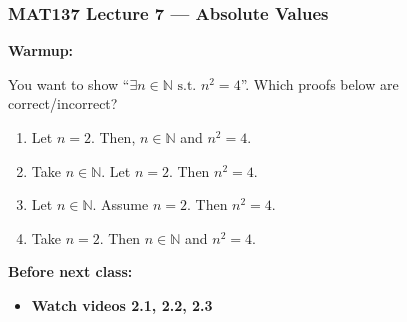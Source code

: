 \documentclass[14pt]{beamer}
\date{}
\title{}
\author{}
\begin{document}

\begin{frame}
\frametitle{MAT137 Lecture 7 --- Absolute Values}
	{\bf Warmup:}
\vfill

	You want to show ``$\exists n\in \mathbb N\text{ s.t. }n^2=4$''. Which proofs below
	are correct/incorrect?
	\begin{multicols}{2}

		\begin{enumerate}
		

			\item Let $n=2$. Then, $n\in \mathbb N$ and $n^2=4$.


			\item 		Take $n\in \mathbb N$. Let $n=2$. Then $n^2=4$.

		\columnbreak

	\item 		Let $n\in\mathbb N$. Assume $n=2$. Then $n^2=4$.


		
	\item	Take $n=2$. Then $n\in \mathbb N$ and $n^2=4$.

		\end{enumerate}

	\end{multicols}

	\vfill
	{\bf Before next class:}
		\begin{itemize} \normalsize
			\item {\bf Watch videos 2.1, 2.2, 2.3 }
		\end{itemize}
	\vfill

\end{frame}
\end{document}
